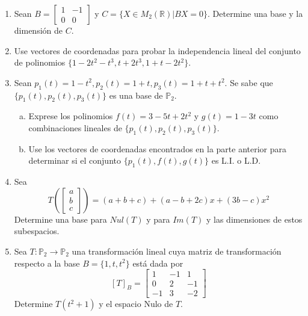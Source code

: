 \documentclass[12pt]{article}
\newenvironment{preguntas}
{\begin{enumerate}\itemsep12pt
	}
	{
	\end{enumerate}
}
\newcommand{\ra}{\rightarrow}
\newcommand{\R}{\mathbb{R}}
\begin{document}
\begin{preguntas}
$$\begin{pmatrix}
	0 \\ 0 \\ 0 \\ 0 \\ 0
	\end{pmatrix}$$
\begin{enumerate}[a)]
\item Determine las dimensiones de $Col(A)$, de $Fila(A)$ y de $Nul(A^T)$
\item Determine, en los casos que sea posible, bases para los espacios $Nul(A^T)$ y $Fila(A)$.
\end{enumerate}
\item Sean $B = \begin{bmatrix} 1 & -1 \\ 0 & 0 \end{bmatrix}$ y $C = \{X \in M_2(\R)|BX=0\}$. Determine una base y la dimensión de $C$.
\item Use vectores de coordenadas para probar la independencia lineal del conjunto de polinomios $\{1-2t^2-t^3,t+2t^3,1+t-2t^2\}$.
\item Sean $p_1(t) = 1-t^2, p_2(t) = 1+t, p_3(t) = 1+t+t^2$. Se sabe que $\{p_1(t), p_2(t), p_3(t)\}$ es una base de $\mathbb{P}_2$.
\begin{enumerate}[a)]
\item Exprese los polinomios $f(t) = 3-5t + 2t^2$ y $g(t) = 1-3t$ como combinaciones lineales de $\{p_1(t), p_2(t), p_3(t)\}$.
\item Use los vectores de coordenadas encontrados en la parte anterior para determinar si el conjunto $\{p_1(t), f(t), g(t)\}$ es L.I. o L.D.
\end{enumerate}
\item Sea
$$T\left(\left[ \begin{array}{c}
a\\ b\\ c \end{array} \right] \right) = (a+b+c) + (a-b+2c)x +
(3b-c)x^2
$$
Determine una base para $Nul(T) $ y para $Im (T) $ y las dimensiones de estos subespacios.
\item Sea $T: \mathbb{P}_2 \ra \mathbb{P}_2$ una transformación lineal cuya matriz de transformación respecto a la base $B = \{1, t, t^2\}$ está dada por
$$[T]_B = \begin{bmatrix}
1 & -1 & 1\\
0 & 2 & -1\\
-1 & 3 & -2
\end{bmatrix}$$
Determine $T(t^2+1)$ y el espacio Nulo de $T$.

\end{preguntas}
\end{document}
